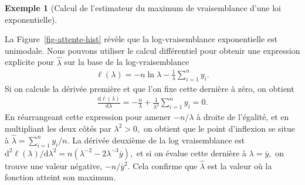 \documentclass[
  11pt,
  letterpaper,
]{scrbook}
\theoremstyle{plain}
\theoremstyle{plain}
\theoremstyle{definition}
\newtheorem{example}{Exemple}[chapter]
\theoremstyle{definition}
\theoremstyle{remark}
\begin{document}
\begin{example}[Calcul de l'estimateur du maximum de vraisemblance d'une
loi
exponentielle]\protect\hypertarget{exm-exponential-mle}{}\label{exm-exponential-mle}

La Figure~\ref{fig-attente-hist} révèle que la log-vraisemblance
exponentielle est unimodale. Nous pouvons utiliser le calcul
différentiel pour obtenir une expression explicite pour
\(\widehat{\lambda}\) sur la base de la log-vraisemblance \begin{align*}
\ell(\lambda) = -n \ln\lambda -\frac{1}{\lambda} \sum_{i=1}^n y_i.
\end{align*} Si on calcule la dérivée première et que l'on fixe cette
dernière à zéro, on obtient \begin{align*}
\frac{\mathrm{d} \ell(\lambda)}{\mathrm{d} \lambda}  = -\frac{n}{\lambda} + \frac{1}{\lambda^2} \sum_{i=1}^n y_i = 0.
\end{align*} En réarrangeant cette expression pour amener \(-n/\lambda\)
à droite de l'égalité, et en multipliant les deux côtés par
\(\lambda^2>0,\) on obtient que le point d'inflexion se situe à
\(\widehat{\lambda} = \sum_{i=1}^n y_i / n.\) La dérivée deuxième de la
log vraisemblance est
\(\mathrm{d}^2 \ell(\lambda)/\mathrm{d} \lambda^2 = n(\lambda^{-2} - 2\lambda^{-3}\overline{y}),\)
et si on évalue cette dernière à \(\lambda = \overline{y},\) on trouve
une valeur négative, \(-n/\overline{y}^2.\) Cela confirme que
\(\widehat{\lambda}\) est la valeur où la fonction atteint son maximum.

\end{example}
\end{document}
